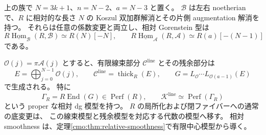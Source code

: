 \begin{proposition}
\label{cmo:prop:proper-contraction}
上の族で $N=3k+1$、$n=N-2$、$a=N-3$ と置く。
$\mathscr B$ は左右 noetherian で、$R$ に相対的な長さ $N$ の
Koszul 双加群解消とその片側 augmentation 解消を持つ。
それらは任意の係数変更と両立し、相対 Gorenstein 型は
\[
 R\underline{\operatorname{Hom}}_{\mathscr B}(R,\mathscr B)
       \simeq R(N)[-N],\qquad
 R\underline{\operatorname{Hom}}_{\mathscr A}(R,\mathscr A)
       \simeq R(a)[-(N-1)]
\]
である。

$\mathcal O(j)=\pi\mathscr A(j)$ とすると、有限線束部分
$\mathscr C^{\mathrm{line}}$ とその残余部分は
\[
 E=\bigoplus_{j=0}^{N-1}\mathcal O(j),\qquad
 \mathscr C^{\mathrm{line}}=\operatorname{thick}_R(E),\qquad
 G=L_{\mathcal O}\cdots L_{\mathcal O(a-1)}(E)
\]
で生成される。
特に
\[
 \Gamma_R=R\operatorname{End}(G)\in\operatorname{Perf}(R),\qquad
 \mathscr K^{\mathrm{line}}\simeq\operatorname{Perf}(\Gamma_R)
\]
という proper な相対 dg 模型を持つ。
 $R$ の局所化および閉ファイバーへの通常の底変更は、
この線束模型と残余模型を対応する代数の模型へ移す。
相対 smoothness は、定理\ref{cmo:thm:relative-smoothness}で有限中心模型から導く。
\end{proposition}

